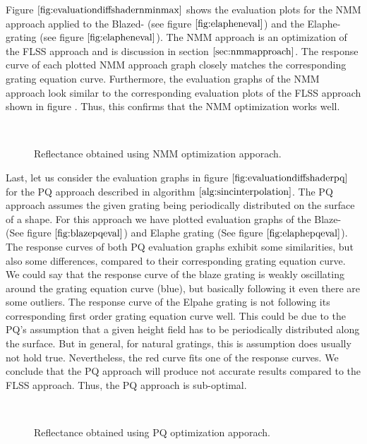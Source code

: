 Figure $\ref{fig:evaluationdiffshadernminmax}$ shows the evaluation plots for the NMM approach applied to the Blazed- (see figure $\ref{fig:elapheneval}$) and the Elaphe-grating (see figure $\ref{fig:elapheneval}$). The NMM approach is an optimization of the FLSS approach and is discussion in section $\ref{sec:nmmapproach}$. The response curve of each plotted NMM approach graph closely matches the corresponding grating equation curve. Furthermore, the evaluation graphs of the NMM approach look similar to the corresponding evaluation plots of the FLSS approach shown in figure $\label{ref:evaluationdiffshaderalllambda}$. Thus, this confirms that the NMM optimization works well.

\begin{figure}[H]
  \centering
~
\caption[Validation of NMM Approach applied on our Gratings]{Reflectance obtained using NMM optimization apporach.}
\label{fig:evaluationdiffshadernminmax}
\end{figure}

Last, let us consider the evaluation graphs in figure $\ref{fig:evaluationdiffshaderpq}$ for the PQ approach described in algorithm $\ref{alg:sincinterpolation}$. The PQ approach assumes the given grating being periodically distributed on the surface of a shape. For this approach we have plotted evaluation graphs of the Blaze- (See figure $\ref{fig:blazepqeval}$) and Elaphe grating (See figure $\ref{fig:elaphepqeval}$). The response curves of both PQ evaluation graphs exhibit some similarities, but also some differences, compared to their corresponding grating equation curve. We could say that the response curve of the blaze grating is weakly oscillating around the grating equation curve (blue), but basically following it even there are some outliers. The response curve of the Elpahe grating is not following its corresponding first order grating equation curve well. This could be due to the PQ's assumption that a given height field has to be periodically distributed along the surface. But in general, for natural gratings, this is assumption does usually not hold true. Nevertheless, the red curve fits one of the response curves. We conclude that the PQ approach will produce not accurate results compared to the FLSS approach. Thus, the PQ approach is sub-optimal.

\begin{figure}[H]
  \centering
~
\caption[Validation of PQ Approach applied on our Gratings]{Reflectance obtained using PQ optimization apporach.}
\label{fig:evaluationdiffshaderpq}
\end{figure}
